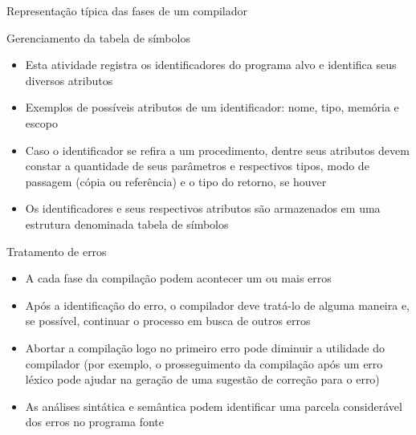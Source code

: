 \begin{frame}[fragile]{Representação típica das fases de um compilador}
\begin{figure}
    \end{figure}

\end{frame}

\begin{frame}[fragile]{Gerenciamento da tabela de símbolos}

    \begin{itemize}
        \item Esta atividade registra os identificadores do programa alvo e identifica seus diversos atributos

        \item Exemplos de possíveis atributos de um identificador: nome, tipo, memória e escopo

        \item Caso o identificador se refira a um procedimento, dentre seus atributos devem constar a quantidade de seus parâmetros e respectivos tipos, modo 
            de passagem (cópia ou referência) e o tipo do retorno, se houver

        \item Os identificadores e seus respectivos atributos são armazenados em uma estrutura denominada tabela de símbolos
    \end{itemize}

\end{frame}

\begin{frame}[fragile]{Tratamento de erros}

    \begin{itemize}
        \item A cada fase da compilação podem acontecer um ou mais erros

        \item Após a identificação do erro, o compilador deve tratá-lo de alguma maneira e, se possível, continuar o processo em busca de outros erros

        \item Abortar a compilação logo no primeiro erro pode diminuir a utilidade do compilador (por exemplo, o prosseguimento da compilação após um erro
            léxico pode ajudar na geração de uma sugestão de correção para o erro)

        \item As análises sintática e semântica podem identificar uma parcela considerável dos erros no programa fonte
    \end{itemize}

\end{frame}

